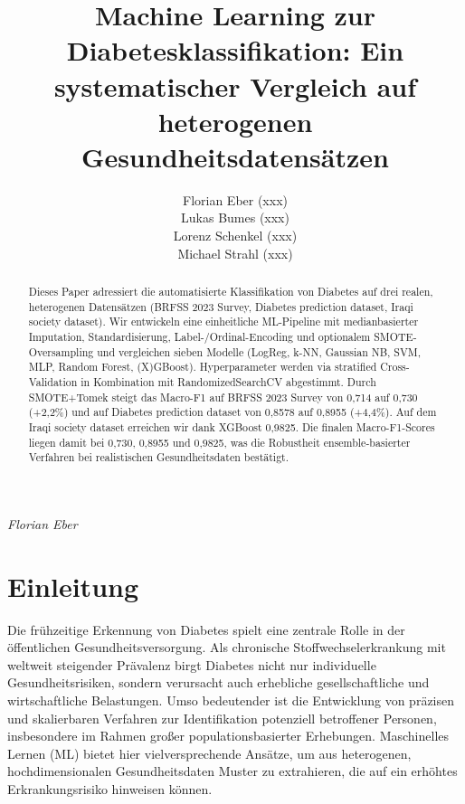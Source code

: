 \documentclass[10pt]{scrartcl}
\begin{document}
\title{\LARGE Machine Learning zur Diabetesklassifikation: Ein systematischer Vergleich auf heterogenen Gesundheitsdatensätzen}
\author{
	Florian Eber (xxx)\\
	Lukas Bumes (xxx)\\
	Lorenz Schenkel (xxx)\\
	Michael Strahl (xxx)
}
\date{}
\maketitle




\begin{abstract}
Dieses Paper adressiert die automatisierte Klassifikation von Diabetes auf drei realen, heterogenen Datensätzen (BRFSS 2023 Survey, Diabetes prediction dataset, Iraqi society dataset). Wir entwickeln eine einheitliche ML-Pipeline mit medianbasierter Imputation, Standardisierung, Label-/Ordinal-Encoding und optionalem SMOTE-Oversampling und vergleichen sieben Modelle (LogReg, k-NN, Gaussian NB, SVM, MLP, Random Forest, (X)GBoost). Hyperparameter werden via stratified Cross-Validation in Kombination mit RandomizedSearchCV abgestimmt. Durch SMOTE+Tomek steigt das Macro-F1 auf BRFSS 2023 Survey von 0,714 auf 0,730 (+2,2\%) und auf Diabetes prediction dataset von 0,8578 auf 0,8955 (+4,4\%). Auf dem Iraqi society dataset erreichen wir dank XGBoost 0,9825. Die finalen Macro-F1-Scores liegen damit bei 0,730, 0,8955 und 0,9825, was die Robustheit ensemble-basierter Verfahren bei realistischen Gesundheitsdaten bestätigt.
\end{abstract}
\begin{flushright}
  \footnotesize\textit{Florian Eber}
\end{flushright}


\newpage


\section{Einleitung}

Die frühzeitige Erkennung von Diabetes spielt eine zentrale Rolle in der öffentlichen Gesundheitsversorgung. Als chronische Stoffwechselerkrankung mit weltweit steigender Prävalenz birgt Diabetes nicht nur individuelle Gesundheitsrisiken, sondern verursacht auch erhebliche gesellschaftliche und wirtschaftliche Belastungen. Umso bedeutender ist die Entwicklung von präzisen und skalierbaren Verfahren zur Identifikation potenziell betroffener Personen, insbesondere im Rahmen großer populationsbasierter Erhebungen. Maschinelles Lernen (ML) bietet hier vielversprechende Ansätze, um aus heterogenen, hochdimensionalen Gesundheitsdaten Muster zu extrahieren, die auf ein erhöhtes Erkrankungsrisiko hinweisen können.
\end{document}
